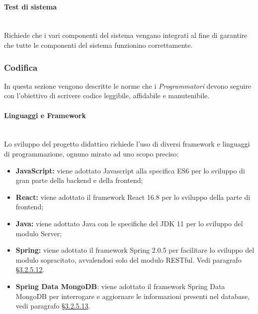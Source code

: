 \paragraph{Test di sistema}\mbox{}\\
Richiede che i vari componenti del sistema vengano integrati al fine di garantire che tutte le componenti del sistema funzionino correttamente.

\subsubsection{Codifica}
In questa sezione vengono descritte le norme che i \textit{Programmatori} devono seguire con l'obiettivo di scrivere codice leggibile, affidabile e manutenibile.

\paragraph{Linguaggi e Framework}\mbox{}\\
Lo sviluppo del progetto didattico richiede l'uso di diversi framework e linguaggi di programmazione, ognuno mirato ad uno scopo preciso:
\begin{itemize}
	\item \textbf{JavaScript:} viene adottato Javascript alla specifica ES6 per lo sviluppo di gran parte della backend e della frontend;
	\item \textbf{React:} viene adottato il framework React 16.8 per lo sviluppo della parte di frontend;
	\item \textbf{Java:} viene adottato Java con le specifiche del JDK 11 per lo sviluppo del modulo Server;
	\item \textbf{Spring:} viene adottato il framework Spring 2.0.5 per facilitare lo sviluppo del modulo sopracitato, avvalendosi solo del modulo RESTful. Vedi paragrafo \hyperref[sec:Spring]{§3.2.5.12}.
	\item \textbf{Spring Data MongoDB}: viene adottato il framework Spring Data MongoDB per interrogare e aggiornare le informazioni presenti nel database, vedi paragrafo \hyperref[sec:DataMongoDB]{§3.2.5.13}.
\end{itemize}


